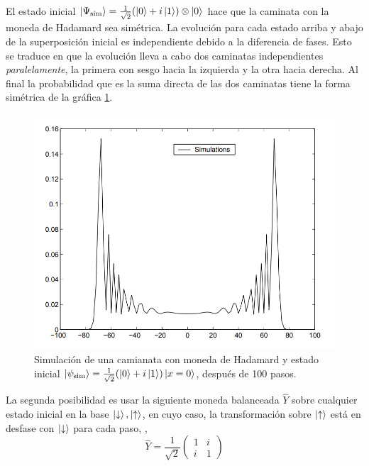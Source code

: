 El estado inicial $\ket{\Psi_{\text{sim}}}=\frac{1}{\sqrt{2}}(\ket{0}+i\ket{1})\otimes \ket{0}$ hace que la caminata con la moneda de Hadamard sea simétrica. La evolución para cada estado arriba y abajo de la superposición inicial es independiente debido a la diferencia de fases. Esto se traduce en que la evolución lleva a cabo dos caminatas independientes \textit{paralelamente}, la primera con sesgo hacia la izquierda y la otra hacia derecha. Al final la probabilidad que es la suma directa de las dos caminatas tiene la forma simétrica de la gráfica \ref{gr:Hadamard100Symmetric}. \\

\begin{figure}[ht]
\centering
\includegraphics[width=1\textwidth]{Kap3/QWonlinesymmetricNayak.png}
\caption{Simulación de una camianata con moneda de Hadamard y estado inicial $\ket{\psi_{\text{sim}}}=\frac{1}{\sqrt{2}}(\ket{0}+i\ket{1})\ket{x=0}$, después de 100 pasos.}
\label{gr:Hadamard100Symmetric}
\end{figure}

La segunda posibilidad es usar la siguiente moneda balanceada $\hat{Y}$ sobre cualquier estado inicial en la base $\ket{\downarrow},\ket{\uparrow}$, en cuyo caso, la transformación sobre $\ket{\uparrow}$ está en desfase con $\ket{\downarrow}$ para cada paso, \cite{kempe2003quantum},
\begin{equation}
\hat{Y}=\dfrac{1}{\sqrt{2}}
\begin{pmatrix}
1 & i\\
i & 1
\end{pmatrix}
\end{equation}{}

